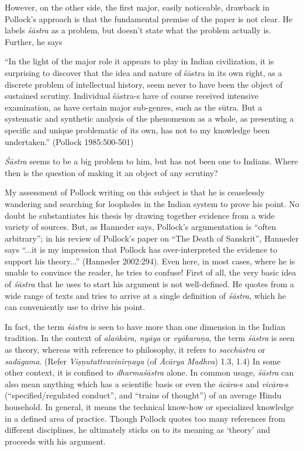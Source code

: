 However, on the other side, the first major, easily noticeable, drawback in Pollock's approach is that the fundamental premise of the paper is not clear. He labels {\sl śāstra} as a problem, but doesn't state what the problem actually is. Further, he says
\begin{myquote}
``In the light of the major role it appears to play in Indian civilization, it is surprising to discover that the idea and nature of śāstra in its own right, as a discrete problem of intellectual history, seem never to have been the object of sustained scrutiny. Individual śāstra-s have of course received intensive examination, as have certain major sub-genres, such as the sūtra. But a systematic and synthetic analysis of the phenomenon as a whole, as presenting a specific and unique problematic of its own, has not to my knowledge been undertaken.'' (Pollock 1985:500-501)
\end{myquote}

{\sl Śāstra} seems to be a big problem to him, but has not been one to Indians. Where then is the question of making it an object of any scrutiny? 

My assessment of Pollock writing on this subject is that he is ceaselessly wandering and searching for loopholes in the Indian system to prove his point. No doubt he substantiates his thesis by drawing together evidence from a wide variety of sources. But, as Hanneder says, Pollock's argumentation is ``often arbitrary''; in his review of Pollock's paper on ``The Death of Sanskrit'', Hanneder says ``...it is my impression that Pollock has over-interpreted the evidence to support his theory...'' (Hanneder 2002:294). Even here, in most cases, where he is unable to convince the reader, he tries to confuse! First of all, the very basic idea of {\sl śāstra} that he uses to start his argument is not well-defined. He quotes from a wide range of texts and tries to arrive at a single definition of {\sl śāstra}, which he can conveniently use to drive his point. 

In fact, the term {\sl śāstra} is seen to have more than one dimension in the Indian tradition. In the context of {\sl alaṅkāra, nyāya} or {\sl vyākaraṇa}, the term {\sl śāstra} is seen as theory, whereas with reference to philosophy, it refers to {\sl sacchāstra} or {\sl sadāgama}. (Refer {\sl Viṣṇutattvavinirṇaya} (of {\sl Ācārya Madhva}) 1.3, 1.4)  In some other context, it is confined to {\sl dharmaśāstra} alone. In common usage, {\sl śāstra} can also mean anything which has a scientific basis or even the {\sl ācāra}-s and {\sl vicāra}-s (``specified/regulated conduct'', and ``trains of thought'') of an average Hindu household. In general, it means the technical know-how or specialized knowledge in a defined area of practice. Though Pollock quotes too many references from different disciplines, he ultimately sticks on to its meaning as `theory' and proceeds with his argument. 


